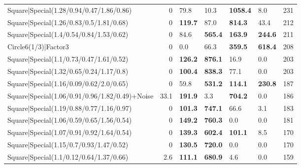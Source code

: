 \begin{tabular}{lrllllr}
 Square|Special(1.28/0.94/0.47/1.86/0.86)                      &             0   & 79.8           & 10.3            & \textbf{1058.4} & 8.0             &          231 \\
 Square|Special(1.26/0.83/0.5/1.81/0.68)                       &             0   & \textbf{119.7} & 87.0            & \textbf{814.3}  & 43.4            &          212 \\
 Square|Special(1.4/0.54/0.84/1.53/0.62)                       &             0   & 84.6           & \textbf{565.4}  & \textbf{163.9}  & \textbf{244.6}  &          211 \\
 Circle6(1/3)|Factor3                                          &             0   & 0.0            & 66.3            & \textbf{359.5}  & \textbf{618.4}  &          208 \\
 Square|Special(1.1/0.73/0.47/1.61/0.52)                       &             0   & \textbf{126.2} & \textbf{876.1}  & 16.9            & 0.0             &          203 \\
 Square|Special(1.32/0.65/0.24/1.17/0.8)                       &             0   & \textbf{100.4} & \textbf{838.3}  & 77.1            & 0.0             &          203 \\
 Square|Special(1.16/0.09/0.62/2.0/0.65)                       &             0   & 59.8           & \textbf{531.2}  & \textbf{114.1}  & \textbf{230.8}  &          187 \\
 Square|Special(1.06/0.91/0.96/1.82/0.49)+Noise                &            33.1 & \textbf{191.9} & 3.3             & \textbf{704.2}  & 0.0             &          186 \\
 Square|Special(1.19/0.88/0.77/1.16/0.97)                      &             0   & \textbf{101.3} & \textbf{747.1}  & 66.6            & 3.1             &          183 \\
 Square|Special(1.06/0.59/0.65/1.56/0.54)                      &             0   & \textbf{149.2} & \textbf{760.3}  & 0.0             & 0.0             &          181 \\
 Square|Special(1.07/0.91/0.92/1.64/0.54)                      &             0   & \textbf{139.3} & \textbf{602.4}  & \textbf{101.1}  & 8.5             &          170 \\
 Square|Special(1.15/0.7/0.93/1.47/0.52)                       &             0   & \textbf{130.5} & \textbf{720.0}  & 0.0             & 0.0             &          170 \\
 Square|Special(1.1/0.12/0.64/1.37/0.66)                       &             2.6 & \textbf{111.1} & \textbf{680.9}  & 4.6             & 0.0             &          159 \\

\end{tabular}
